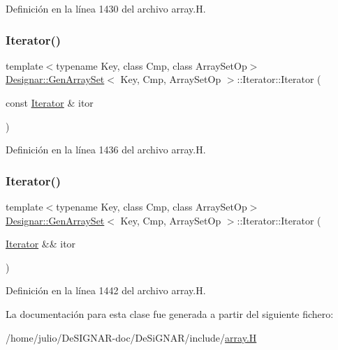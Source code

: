 Definición en la línea 1430 del archivo array.\+H.

\mbox{\label{class_designar_1_1_gen_array_set_1_1_iterator_a080025e4989fd5c3110e93e0c7c17fe2}} 
\subsubsection{\texorpdfstring{Iterator()}{Iterator()}\hspace{0.1cm}{\footnotesize\ttfamily [4/5]}}
{\footnotesize\ttfamily template$<$typename Key, class Cmp, class Array\+Set\+Op$>$ \\
\hyperlink{class_designar_1_1_gen_array_set}{Designar\+::\+Gen\+Array\+Set}$<$ Key, Cmp, Array\+Set\+Op $>$\+::Iterator\+::\+Iterator (\begin{DoxyParamCaption}\item[{const \hyperlink{class_designar_1_1_gen_array_set_1_1_iterator}{Iterator} \&}]{itor }\end{DoxyParamCaption})\hspace{0.3cm}{\ttfamily [inline]}}



Definición en la línea 1436 del archivo array.\+H.

\mbox{\label{class_designar_1_1_gen_array_set_1_1_iterator_aa82e1690f18b28782163e6bbb9d7d32a}} 
\subsubsection{\texorpdfstring{Iterator()}{Iterator()}\hspace{0.1cm}{\footnotesize\ttfamily [5/5]}}
{\footnotesize\ttfamily template$<$typename Key, class Cmp, class Array\+Set\+Op$>$ \\
\hyperlink{class_designar_1_1_gen_array_set}{Designar\+::\+Gen\+Array\+Set}$<$ Key, Cmp, Array\+Set\+Op $>$\+::Iterator\+::\+Iterator (\begin{DoxyParamCaption}\item[{\hyperlink{class_designar_1_1_gen_array_set_1_1_iterator}{Iterator} \&\&}]{itor }\end{DoxyParamCaption})\hspace{0.3cm}{\ttfamily [inline]}}



Definición en la línea 1442 del archivo array.\+H.



La documentación para esta clase fue generada a partir del siguiente fichero\+:\begin{DoxyCompactItemize}
\item 
/home/julio/\+De\+S\+I\+G\+N\+A\+R-\/doc/\+De\+Si\+G\+N\+A\+R/include/\hyperlink{array_8_h}{array.\+H}\end{DoxyCompactItemize}
